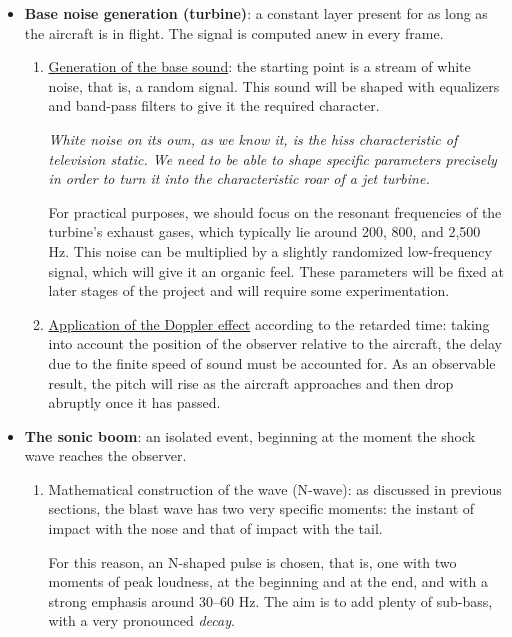 \documentclass[10.5pt]{article}
\begin{document}
	\begin{itemize}
		\item \textbf{Base noise generation (turbine)}: a constant layer present for as long as the aircraft is in flight. The signal is computed anew in every frame.
		\begin{enumerate}
			\item \uline{Generation of the base sound}: the starting point is a stream of white noise, that is, a random signal. This sound will be shaped with equalizers and band-pass filters to give it the required character. 
			
			\textit{White noise on its own, as we know it, is the hiss characteristic of television static. We need to be able to shape specific parameters precisely in order to turn it into the characteristic roar of a jet turbine.}
			
			For practical purposes, we should focus on the resonant frequencies of the turbine's exhaust gases, which typically lie around 200, 800, and 2,500 Hz. This noise can be multiplied by a slightly randomized low-frequency signal, which will give it an organic feel. These parameters will be fixed at later stages of the project and will require some experimentation.
			
			\item \uline{Application of the Doppler effect} according to the retarded time: taking into account the position of the observer relative to the aircraft, the delay due to the finite speed of sound must be accounted for. As an observable result, the pitch will rise as the aircraft approaches and then drop abruptly once it has passed. 
			
			
		\end{enumerate}
		
		\item \textbf{The sonic boom}: an isolated event, beginning at the moment the shock wave reaches the observer. 
		
		\begin{enumerate}
			\item Mathematical construction of the wave (N-wave): as discussed in previous sections, the blast wave has two very specific moments: the instant of impact with the nose and that of impact with the tail.
			
			For this reason, an N-shaped pulse is chosen, that is, one with two moments of peak loudness, at the beginning and at the end, and with a strong emphasis around 30--60 Hz. The aim is to add plenty of sub-bass, with a very pronounced \textit{decay}.
			

\end{enumerate}
\end{itemize}
\end{document}

